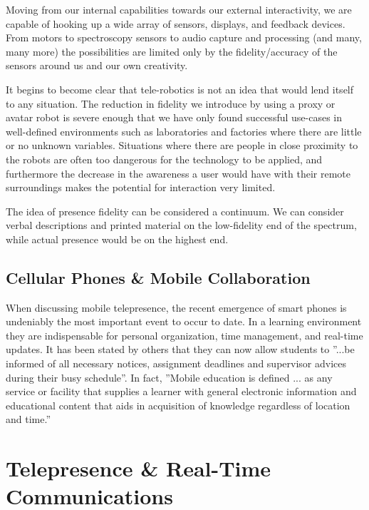 \documentclass[a4paper,12pt]{report}
\begin{document}
Moving from our internal capabilities towards our external interactivity, we are capable of hooking up a wide array of sensors, displays, and feedback devices. From motors to spectroscopy sensors to audio capture and processing (and many, many more) the possibilities are limited only by the fidelity/accuracy of the sensors around us and our own creativity.

It begins to become clear that tele-robotics is not an idea that would lend itself to any situation. The reduction in fidelity we introduce by using a proxy or avatar robot is severe enough that we have only found successful use-cases in well-defined environments such as laboratories and factories where there are little or no unknown variables. Situations where there are people in close proximity to the robots are often too dangerous for the technology to be applied, and furthermore the decrease in the awareness a user would have with their remote surroundings makes the potential for interaction very limited.

\cite{540147,6104414}

The idea of presence fidelity can be considered a continuum. We can consider verbal descriptions and printed material on the low-fidelity end of the spectrum, while actual presence would be on the highest end. \cite{726589}%

\subsection{Cellular Phones \& Mobile Collaboration} When discussing mobile telepresence, the recent emergence of smart phones is undeniably the most important event to occur to date. In a learning environment they are indispensable for personal organization, time management, and real-time updates. It has been stated by others that they can now allow students to ''...be informed of all necessary notices, assignment deadlines and supervisor advices during their busy schedule''. In fact, ''Mobile education is defined ... as any service or facility that supplies a learner with general electronic information and educational content that aids in acquisition of knowledge regardless of location and time.'' \cite{4469080,6007847}

\section{Telepresence \& Real-Time Communications}
\end{document}
